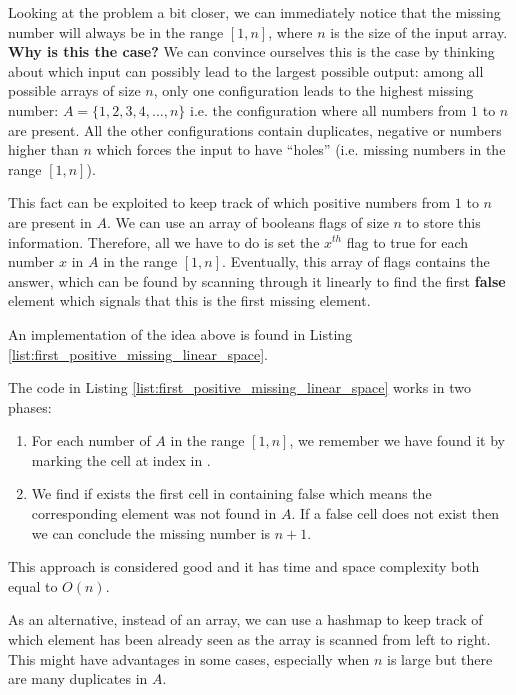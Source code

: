 Looking at the problem a bit closer, we can immediately notice that the missing number will always be
in the range $[1,n]$, where $n$ is the size of the input array. \textbf{Why is this the case?}
We can convince ourselves this is the case by thinking about which input can possibly lead to the largest possible output: among
all possible arrays of size $n$, only one configuration leads to the highest missing number: $A =
\{1,2,3,4, \ldots ,n\}$ i.e. the configuration where all numbers from $1$ to $n$ are present. All the other configurations contain duplicates,
negative or numbers higher than $n$ which forces the input to have ``holes'' (i.e. missing numbers in the range $[1,n]$). 

This fact can be exploited to keep track of which positive numbers from
$1$ to $n$ are present in $A$. We can use an array of booleans flags of size $n$ to store this information. Therefore, all we have to do is set the $x^{th}$ flag to true for each number  $x$ in $A$ in the range $[1,n]$.
Eventually, this array of flags contains the answer, which can be found by scanning through it linearly to find the first \textbf{false} element which signals that this is the first missing element.

An implementation of the idea above is found in Listing \ref{list:first_positive_missing_linear_space}.




The code in Listing \ref{list:first_positive_missing_linear_space} works in two phases:
\begin{enumerate}
	\item For each number  of $A$ in the range $[1,n]$, we remember we have found it by marking the cell at index  in .
	\item We find if exists the first cell in  containing false which means the corresponding element was not found in $A$. If a false cell does not exist then we can conclude the missing number is $n+1$.
\end{enumerate}
This approach is considered good and it has time and space complexity both equal to $O(n)$.

As an alternative, instead of an array, we can use a hashmap to keep track of which element has
been already seen as the array is scanned from left to right. This might have advantages in some cases, especially when $n$ is large but there are many duplicates in $A$. 


